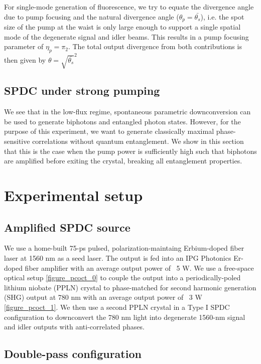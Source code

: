For single-mode generation of fluorescence, we try to equate the divergence angle due to pump focusing and the natural divergence angle ($\theta_p = \bar{\theta_s}$), i.e. the spot size of the pump at the waist is only large enough to support a single spatial mode of the degenerate signal and idler beams. This results in a pump focusing parameter of $\eta_p = \pi_2$. The total output divergence from both contributions is then given by $\theta = \sqrt{\bar{\theta_s}}^2$

\subsection{SPDC under strong pumping}

We see that in the low-flux regime, spontaneous parametric downconversion can be used to generate biphotons and entangled photon states. However, for the purpose of this experiment, we want to generate classically maximal phase-sensitive correlations without quantum entanglement. We show in this section that this is the case when the pump power is sufficiently high such that biphotons are amplified before exiting the crystal, breaking all entanglement properties.

\section{Experimental setup}

\subsection{Amplified SPDC source}

We use a home-built \cite{dheera_masters} 75-ps pulsed, polarization-maintaing Erbium-doped fiber laser at 1560 nm as a seed laser. The output is fed into an IPG Photonics Er-doped fiber amplifier with an average output power of ~5 W. We use a free-space optical setup \ref{figure_pcoct_0} to couple the output into a periodically-poled lithium niobate (PPLN) crystal to phase-matched for second harmonic generation (SHG) output at 780 nm with an average output power of ~3 W \ref{figure_pcoct_1}. We then use a second PPLN crystal in a Type I SPDC configuration to downconvert the 780 nm light into degenerate 1560-nm signal and idler outputs with anti-correlated phases.

\subsection{Double-pass configuration}

